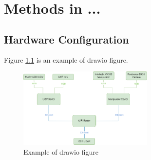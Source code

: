 \chapter{Methods in ...}







\section{Hardware Configuration}
Figure \ref{fig:example_drawio} is an example of drawio figure.

\begin{figure}[H]
  \centering
  \includegraphics[width = 0.6\textwidth]{Figures/example_figure.drawio.png}
  \caption{Example of drawio figure}
  \label{fig:example_drawio}
\end{figure}
